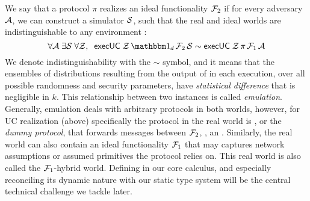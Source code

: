 We say that a protocol $\pi$ realizes an ideal functionality $\mathcal{F}_2$
if for every adversary $\mathcal{A}$, we can construct a simulator $\mathcal{S}$, such that the real and ideal worlds are indistinguishable to any environment \Z:
\begin{equation}
  \label{eqn:emulation}
  \forall \A \; \exists \Sim \; \forall \Z, \; \; \msf{execUC} \; \Z \, \idealP \, \F_2 \, \Sim \sim \msf{execUC} \; \Z \, \pi \, \F_1 \, \A
\end{equation}
We denote indistinguishability with the $\sim$ symbol, and it means that the ensembles of distributions resulting from the output of \Z in each execution, over all possible randomness and security parameters, have \emph{statistical difference} that is negligible in $k$. This relationship between two  instances is called \emph{emulation}. 
Generally, emulation deals with arbitrary protocols in both worlds, however, for UC realization (above) specifically the protocol in the real world is \idealP, or the \emph{dummy protocol}, that forwards messages between $\mathcal{F}_2$, \Z,  an \A. 
Similarly, the real world can also contain an ideal functionality $\mathcal{F}_1$ that may captures network assumptions or assumed primitives the protocol relies on. 
This real world is also called the $\mathcal{F}_1$-hybrid world.
Defining  in our core calculus, and especially reconciling its dynamic nature with our static type system will be the central technical challenge we tackle later.

